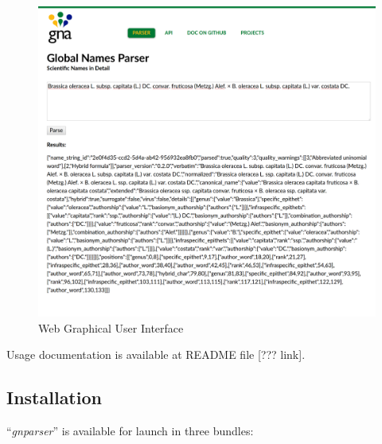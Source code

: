 \documentclass{bmcart}
\begin{document}
\begin{figure}[htbp]
  \begin{center}
    \caption{
      Web Graphical User Interface
    }\label{figure:webgui}
    \vspace{5mm}

    \includegraphics[scale=0.175]{images/web_gui.png}
  \end{center}
\end{figure}

Usage documentation is available at README file [??? link].

\subsection*{Installation}

``\textit{gnparser}'' is available for launch in three bundles:
\end{document}
